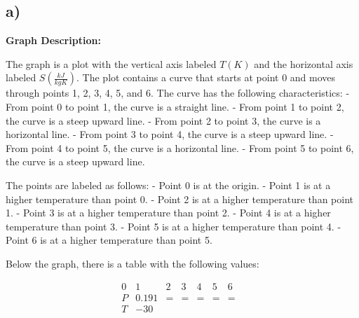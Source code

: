 

\subsection*{a)}

\begin{center}
\textbf{Graph Description:}
\end{center}

The graph is a plot with the vertical axis labeled \( T(K) \) and the horizontal axis labeled \( S \left( \frac{kJ}{kgK} \right) \). The plot contains a curve that starts at point 0 and moves through points 1, 2, 3, 4, 5, and 6. The curve has the following characteristics:
- From point 0 to point 1, the curve is a straight line.
- From point 1 to point 2, the curve is a steep upward line.
- From point 2 to point 3, the curve is a horizontal line.
- From point 3 to point 4, the curve is a steep upward line.
- From point 4 to point 5, the curve is a horizontal line.
- From point 5 to point 6, the curve is a steep upward line.

The points are labeled as follows:
- Point 0 is at the origin.
- Point 1 is at a higher temperature than point 0.
- Point 2 is at a higher temperature than point 1.
- Point 3 is at a higher temperature than point 2.
- Point 4 is at a higher temperature than point 3.
- Point 5 is at a higher temperature than point 4.
- Point 6 is at a higher temperature than point 5.

Below the graph, there is a table with the following values:

\[
\begin{array}{ccccccc}
0 & 1 & 2 & 3 & 4 & 5 & 6 \\
P & 0.191 & = & = & = & = & = \\
T & -30 & & & & & & \\
\end{array}
\]